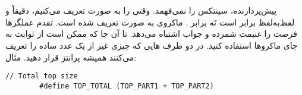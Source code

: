 \section{}
\paragraph{}\label{answer:29}
پیش‌پردازنده، سینتکس  را نمی‌فهمد. وقتی  را به صورت  تعریف می‌کنیم، دقیقاً و لفظ‌به‌لفظ برابر  است نَه برابر . ماکروی  به صورت  تعریف شده است. تقدم عملگرها فرصت را غنیمت شمرده و جواب اشتباه می‌دهد. تا آن جا که ممکن است از ثوابت به جای ماکروها استفاده کنید. در دو طرف هایی که چیزی غیر از یک عدد ساده را تعریف می‌کنند همیشه پرانتز قرار دهید. مثال:
\begin{LTR}
    \begin{lstlisting}[style=C++Style]
        // Total top size
        #define TOP_TOTAL (TOP_PART1 + TOP_PART2)
    \end{lstlisting}
\end{LTR}
